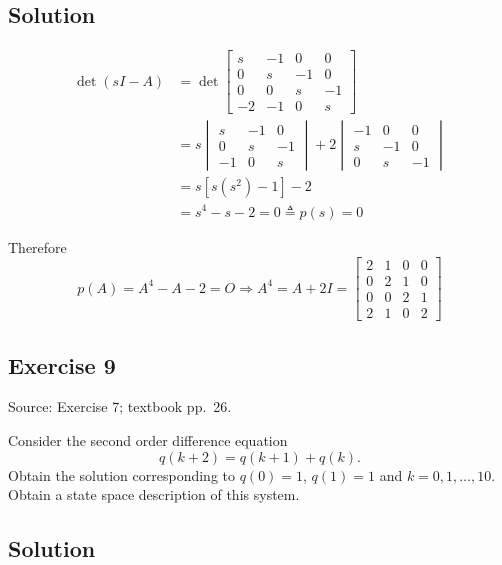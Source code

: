 \documentclass[12pt,a4paper]{article}
\newlength{\questionroom}
\newenvironment{questionprompt}{%
  \begin{lrbox}{\questionbox}\begin{minipage}{\linewidth}%
}{%
  \end{minipage}\end{lrbox}%
  \setlength{\questionroom}{\dimexpr\ht\questionbox+\dp\questionbox+5.2cm\relax}%
  \ifdim\questionroom>\textheight\setlength{\questionroom}{\textheight}\fi
  \Needspace{\questionroom}%
  \noindent\usebox{\questionbox}\par
}
\begin{document}
\subsection*{Solution}

\begin{align*}
	\det (sI - A) &= \det\begin{bmatrix}
		s & -1 & 0 & 0 \\
		0 & s & -1 & 0 \\
		0 & 0 & s & -1 \\
		-2 & -1 & 0 & s
	\end{bmatrix} \\
	&= s \begin{vmatrix}
		s & -1 & 0 \\ 0 & s & -1 \\ -1 & 0 & s
	\end{vmatrix} +  2\begin{vmatrix}
	-1 & 0 & 0 \\ s & -1 & 0 \\ 0 & s & -1
	\end{vmatrix} \\
	&= s [ s (s^2) -1 ] -2 \\
	&= s^4 - s  - 2 = 0 \triangleq p(s) = 0
\end{align*}

Therefore
\[
p(A) = A^4 - A -2 = O \Rightarrow A^4 = A + 2I = \begin{bmatrix}2&1&0&0\\0&2&1&0\\0&0&2&1\\2&1&0&2\end{bmatrix}
\]

\vspace{3.5cm}


\begin{questionprompt}
\section*{Exercise 9}
\label{practice:9}
{\small Source: Exercise 7; textbook pp.~26.}\par
Consider the second order difference equation
\[q(k+2)=q(k+1)+q(k).\]
Obtain the solution corresponding to $q(0)=1$, $q(1)=1$ and $k=0,1,\ldots,10$. Obtain a state space description of this system.
\end{questionprompt}
\subsection*{Solution}
\end{document}

